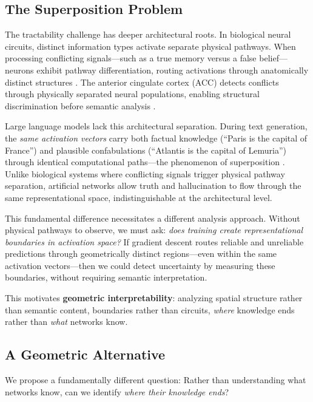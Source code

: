 \documentclass[11pt]{article}
\begin{document}
\subsection{The Superposition Problem}
\label{sec:intro-superposition}

The tractability challenge has deeper architectural roots. In biological neural circuits, distinct information types activate separate physical pathways. When processing conflicting signals---such as a true memory versus a false belief---neurons exhibit pathway differentiation, routing activations through anatomically distinct structures \citep{kandel2000principles}. The anterior cingulate cortex (ACC) detects conflicts through physically separated neural populations, enabling structural discrimination before semantic analysis \citep{botvinick2001conflict, shenhav2013expected}.

Large language models lack this architectural separation. During text generation, the \textit{same activation vectors} carry both factual knowledge (``Paris is the capital of France'') and plausible confabulations (``Atlantis is the capital of Lemuria'') through identical computational paths---the phenomenon of superposition \citep{elhage2022superposition}. Unlike biological systems where conflicting signals trigger physical pathway separation, artificial networks allow truth and hallucination to flow through the same representational space, indistinguishable at the architectural level.

This fundamental difference necessitates a different analysis approach. Without physical pathways to observe, we must ask: \textit{does training create representational boundaries in activation space?} If gradient descent routes reliable and unreliable predictions through geometrically distinct regions---even within the same activation vectors---then we could detect uncertainty by measuring these boundaries, without requiring semantic interpretation.

This motivates \textbf{geometric interpretability}: analyzing spatial structure rather than semantic content, boundaries rather than circuits, \textit{where} knowledge ends rather than \textit{what} networks know.

\subsection{A Geometric Alternative}
\label{sec:intro-alternative}

We propose a fundamentally different question: Rather than understanding what networks know, can we identify \textit{where their knowledge ends}?
\end{document}
